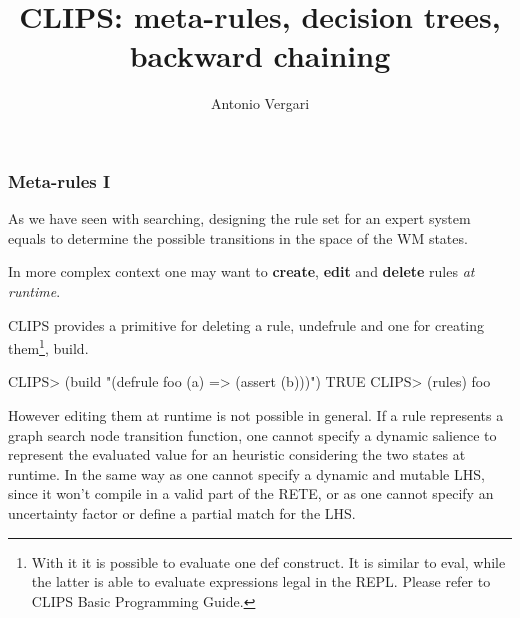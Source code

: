 \documentclass[xcolor={usenames,dvipsnames,svgnames}, compress]{beamer}
\begin{document}
\title{CLIPS: meta-rules, decision trees, backward chaining}
\author{Antonio Vergari}

\footnotesize \let\small\footnotesize





{
  \begin{frame}
    \titlepage
  \end{frame}
}

\begin{frame}[fragile]
  \frametitle{Meta-rules I}
  As we have seen with searching, designing the rule set for an expert system equals to determine the
  possible transitions in the space of the WM states.\par
  In more complex context one may want to \textbf{create}, \textbf{edit} and \textbf{delete}
  rules \emph{at runtime}.\par
  CLIPS provides a primitive for deleting a rule, \textsf{undefrule}
  and one for creating them\footnote{With it it is possible to
    evaluate one \textsf{def} construct. It is similar to
    \textsf{eval}, while the latter is able to evaluate expressions
    legal in the REPL. Please refer to CLIPS Basic
    Programming Guide.}, \textsf{build}.
  \begin{clips-code}
    CLIPS> (build "(defrule foo (a) => (assert (b)))")
    TRUE
    CLIPS> (rules)
    foo
  \end{clips-code}

  However editing them at runtime is not possible in general. If a
  rule represents a graph search node transition function, one cannot
  specify a dynamic salience to represent the evaluated value for an
  heuristic considering the two states at runtime. In the same way as
  one cannot specify a dynamic and mutable LHS, since it won't compile
  in a valid part of the RETE, or as one cannot specify an uncertainty
  factor or define a partial match for the LHS.
\end{frame}
\end{document}
